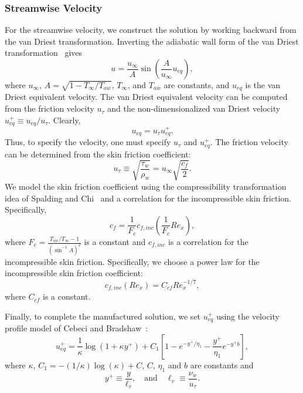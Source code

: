 \subsubsection{Streamwise Velocity}
For the streamwise velocity, we construct the solution by working
backward from the van Driest transformation.  Inverting the adiabatic
wall form of the van Driest transformation~\cite{} gives
%
\begin{equation}
u = \frac{u_{\infty}}{A} \sin \left( \frac{A}{u_{\infty}} u_{eq} \right),
\end{equation}
% 
where $u_{\infty}$, $A = \sqrt{1 - T_{\infty}/T_{aw}}$,
$T_{\infty}$, and $T_{aw}$ are constants, and $u_{eq}$ is the van
Driest equivalent velocity.  The van Driest equivalent velocity can be
computed from the friction velocity $u_{\tau}$ and the
non-dimensionalized van Driest velocity $u_{eq}^+ \equiv
u_{eq}/u_{\tau}$.  Clearly,
%
\begin{equation}
u_{eq} = u_{\tau} u_{eq}^+.
\end{equation}
% 
Thus, to specify the velocity, one must specify $u_{\tau}$ and
$u_{eq}^+$.  The friction velocity can be determined from the skin
friction coefficient:
%
\begin{equation}
u_{\tau} \equiv \sqrt{\frac{\tau_{w}}{\rho_w}} = u_{\infty} \sqrt{\frac{c_f}{2}}.
\end{equation}
% 
We model the skin friction coefficient using the compressibility
transformation idea of Spalding and Chi~\cite{} and a correlation for
the incompressible skin friction.  Specifically,
%
\begin{equation}
c_f = \frac{1}{F_c} c_{f,inc}\left( \frac{1}{F_c} Re_x \right),
\end{equation}
%
where $ F_c = \frac{T_{aw}/T_{\infty} - 1}{ \left( \sin^{-1} A \right)^2} $
%
is a constant and $c_{f,inc}$ is a correlation for the incompressible
skin friction.  Specifically, we choose a power law for the
incompressible skin friction coefficient:
%
\begin{equation}
c_{f,inc}(Re_x) = C_{cf} Re_{x}^{-1/7},
\end{equation}
%
where $C_{cf}$ is a constant.

Finally, to complete the manufactured solution, we set $u^+_{eq}$
using the velocity profile model of Cebeci and Bradshaw~\cite{}:
%
\begin{equation}
u_{eq}^+ = \frac{1}{\kappa} \log \left( 1 + \kappa y^+ \right) + C_1 \left[ 1 - e^{-y^+/\eta_1} - \frac{y^+}{\eta_1} e^{-y^+ b} \right],
\end{equation}
%
where $\kappa$, $C_1 = -(1/\kappa) \log(\kappa) + C$, $C$, $\eta_1$ and $b$ are constants and
%
\begin{equation}
y^+ \equiv \frac{y}{\ell_v}, \quad\text{and}\quad 
\ell_v \equiv \frac{\nu_w}{u_{\tau}}.
\end{equation}
%



